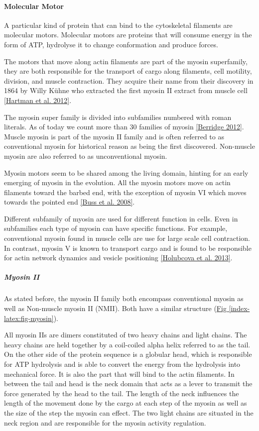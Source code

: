 \documentclass[A4paperpaper,11pt,english]{sphinxmanual}
\begin{document}
\paragraph{Molecular Motor}
\label{index-latex:molecular-motor}
A particular kind of protein that can bind to the cytoskeletal filaments are
molecular motors. Molecular motors are proteins that will consume energy
in the form of ATP, hydrolyse it to change conformation and produce forces.

The motors that move along actin filaments are part of the myosin superfamily, they
are both responsible for the transport of cargo along filaments, cell motility,
division, and muscle contraction. They acquire their name from their discovery
in 1864 by Willy Kühne who extracted the first myosin II extract from muscle
cell {\hyperref[index-latex:hartman2012]{{[}Hartman et al. 2012{]}}}.

The myosin super family is divided into subfamilies numbered with roman literals.
As of today we count more than 30 families of myosin {\hyperref[index-latex:berridge2012a]{{[}Berridge  2012{]}}}.
Muscle myosin is part of the myosin II family and is often referred to  as
conventional myosin for historical reason as being the first discovered.
Non-muscle  myosin are also referred to as unconventional myosin.

Myosin motors seem to be shared among the living domain, hinting for an
early emerging of myosin in the evolution. All the myosin motors move on actin
filaments toward the barbed end, with the exception of myosin VI which moves
towards the pointed end {\hyperref[index-latex:buss2008]{{[}Buss et al. 2008{]}}}.

Different subfamily of myosin are used for different function in cells. Even in
subfamilies each type of myosin can have specific functions. For example,
conventional myosin found in muscle cells are use for large scale cell
contraction. In contrast, myosin V is known to transport cargo and is found to
be responsible for actin network dynamics and vesicle positioning
{\hyperref[index-latex:holubcova2013]{{[}Holubcova et al. 2013{]}}}.


\subparagraph{Myosin II}
\label{index-latex:myoii}\label{index-latex:myosin-ii}
As stated before, the myosin II family both encompass conventional myosin as
well as Non-muscle myosin II (NMII). Both have a similar structure (\hyperref[index-latex:fig-myosin]{Fig  \ref*{index-latex:fig-myosin}}).

All myosin IIs are dimers constituted of two heavy chains and light chains. The
heavy chains are held together by a coil-coiled alpha helix referred to as the
tail. On the other side of the protein sequence is a globular head, which is
responsible for ATP hydrolysis and is able to convert the energy from the
hydrolysis into mechanical force. It is also the part that will bind to the
actin filaments. In between the tail and head is the neck domain that acts as a
lever to transmit the force generated by the head to the tail. The length of
the neck influences the length of the movement done by the cargo at each step of
the myosin as well as the size of the step the myosin can effect. The two light
chains are situated in the neck region and are responsible for the myosin
activity regulation.
\end{document}
